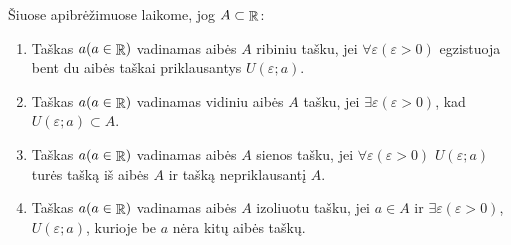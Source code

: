 Šiuose apibrėžimuose laikome, jog $A \subset \mathop{\mathbb{R}}$:
\begin{enumerate}
  \item 
    \begin{defn}
      Taškas $a (a \in \mathop{\mathbb{R}})$ vadinamas aibės $A$ ribiniu tašku, jei 
      $\forall \varepsilon (\varepsilon > 0)$ egzistuoja bent du aibės
      taškai priklausantys $U(\varepsilon; a)$.
    \end{defn}
  \item
    \begin{defn}
      Taškas $a (a \in \mathop{\mathbb{R}})$ vadinamas vidiniu aibės $A$ tašku, jei 
      $\exists \varepsilon (\varepsilon > 0)$, kad 
      $U(\varepsilon; a) \subset A$.
    \end{defn}
  \item 
    \begin{defn}
      Taškas $a (a \in \mathop{\mathbb{R}})$ vadinamas aibės $A$ sienos tašku, jei 
      $\forall \varepsilon (\varepsilon > 0)$ 
      $U(\varepsilon; a)$ turės tašką iš aibės $A$ ir tašką 
      nepriklausantį $A$.
    \end{defn}
  \item 
    \begin{defn}
      Taškas $a (a \in \mathop{\mathbb{R}})$ vadinamas aibės $A$ izoliuotu tašku, jei
      $a \in A$ ir $\exists \varepsilon (\varepsilon > 0)$, 
      $U(\varepsilon; a)$, kurioje be $a$ nėra kitų aibės taškų.
    \end{defn}
\end{enumerate}
